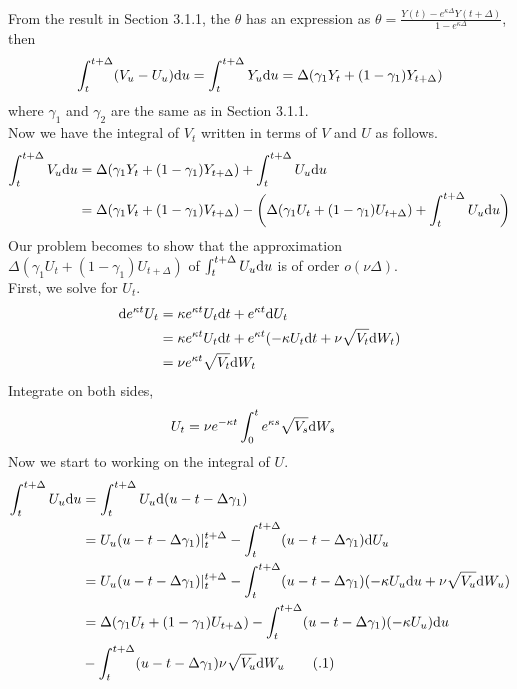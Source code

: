 \documentclass{ws-ijfe}
\newcommand\numberthis{\addtocounter{equation}{1}\tag{\theequation}}
\begin{document}
From the result in Section 3.1.1, the $\theta$ has an expression as $\theta=\frac{Y(t)-e^{\kappa\Delta}Y(t+\Delta)}{1-e^{\kappa\Delta}}$, then
\begin{equation*}
 \int_{t}^{t+\Delta}(V_u-U_u)\mathrm{d} u =\int^{t+\Delta}_t Y_u\mathrm{d} u= \Delta(\gamma_1Y_t+(1-\gamma_1)Y_{t+\Delta})
\end{equation*}
where $\gamma_1$ and $\gamma_2$ are the same as in Section 3.1.1.\\
Now we have the integral of $V_t$ written in terms of $V$ and $U$ as follows.
\begin{equation*}
\begin{split}
   \int_{t}^{t+\Delta}V_u\mathrm{d} u &= \Delta(\gamma_1Y_t+(1-\gamma_1)Y_{t+\Delta})+\int_{t}^{t+\Delta}U_u\mathrm{d} u\\
   &=\Delta(\gamma_1 V_t+(1-\gamma_1) V_{t+\Delta})-\bigg(\Delta(\gamma_1 U_t+(1-\gamma_1) U_{t+\Delta})+\int_{t}^{t+\Delta}U_u\mathrm{d} u\bigg)
\end{split}
\end{equation*}
Our problem becomes to show that the approximation $\Delta(\gamma_1 U_t+(1-\gamma_1) U_{t+\Delta})$ of $\int_{t}^{t+\Delta}U_u\mathrm{d} u$ is of order $o(\nu\Delta)$.\\
First, we solve for $U_t$.
\begin{equation*}
  \begin{split}
     \mathrm{d} e^{\kappa t}U_t & = \kappa e^{\kappa t}U_t\mathrm{d} t + e^{\kappa t}\mathrm{d} U_t \\
       & = \kappa e^{\kappa t}U_t \mathrm{d} t +e^{\kappa t}(-\kappa U_t\mathrm{d} t+\nu\sqrt{V_t}\mathrm{d} W_t) \\
       &= \nu e^{\kappa t}\sqrt{V_t}\mathrm{d} W_t
  \end{split}
\end{equation*}
Integrate on both sides,
\begin{align*}
  U_t & = \nu e^{-\kappa t}\int_{0}^{t}e^{\kappa s}\sqrt{V_s}\mathrm{d} W_s
\end{align*}
Now we start to working on the integral of $U$.
\begin{align*}
  \int_{t}^{t+\Delta}U_u\d u & = \int_{t}^{t+\Delta}U_u\d (u-t-\Delta\gamma_1) \\
   & = U_u(u-t-\Delta\gamma_1)|_t^{t+\Delta}-\int_{t}^{t+\Delta}(u-t-\Delta\gamma_1)\d U_u \\
   & = U_u(u-t-\Delta\gamma_1)|_t^{t+\Delta}-\int_{t}^{t+\Delta}(u-t-\Delta\gamma_1)(-\kappa U_u\d u +\nu\sqrt{V_u}\d W_u)\\
   & = \Delta(\gamma_1U_t+(1-\gamma_1) U_{t+\Delta})-\int_{t}^{t+\Delta}(u-t-\Delta\gamma_1)(-\kappa U_u)\d u\\
   &-\int_{t}^{t+\Delta}(u-t-\Delta\gamma_1)\nu\sqrt{V_u}\d W_u\numberthis\label{appeqnU_t}
\end{align*}
\end{document}
